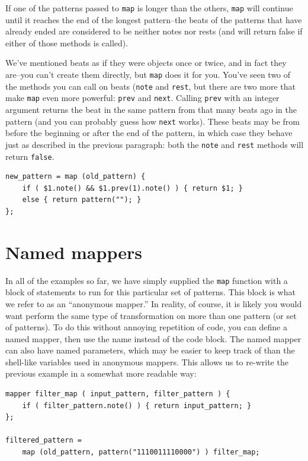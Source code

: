 If one of the patterns passed to {\tt map} is longer than the others, {\tt map} will continue until it reaches the end of the longest pattern--the beats of the patterns that have already ended are considered to be neither notes nor rests (and will return false if either of those methods is called).

We've mentioned beats as if they were objects once or twice, and in fact they are--you can't create them directly, but {\tt map} does it for you.  You've seen two of the methods you can call on beats ({\tt note} and {\tt rest}, but there are two more that make {\tt map} even more powerful:  {\tt prev} and {\tt next}.
Calling {\tt prev} with an integer argument returns the beat in the same pattern from that many beats ago in the pattern (and you can probably guess how {\tt next} works).  These beats may be from before the beginning or after the end of the pattern, in which case they behave just as described in the previous paragraph: both the {\tt note} and {\tt rest} methods will return {\tt false}.

\begin{lstlisting}
new_pattern = map (old_pattern) {
	if ( $1.note() && $1.prev(1).note() ) { return $1; }
	else { return pattern(""); }
};
\end{lstlisting}

\section{Named mappers}

In all of the examples so far, we have simply supplied the {\tt map} function with a block of statements to run for this particular set of patterns.  This block is what we refer to as an ``anonymous mapper.''  In reality, of course, it is likely you would want perform the same type of transformation on more than one pattern (or set of patterns).  To do this without annoying repetition of code, you can define a named mapper, then use the name instead of the code block.  The named mapper can also have named parameters, which may be easier to keep track of than the shell-like variables used in anonymous mappers.  This allows us to re-write the previous example in a somewhat more readable way:
\begin{lstlisting}
mapper filter_map ( input_pattern, filter_pattern ) {
	if ( filter_pattern.note() ) { return input_pattern; }
};

filtered_pattern =
	map (old_pattern, pattern("1110011110000") ) filter_map;
\end{lstlisting}




